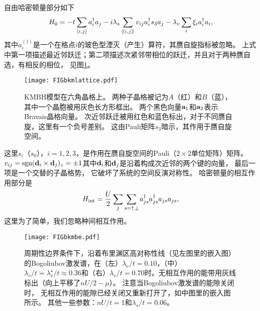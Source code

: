自由哈密顿量部分如下
\begin{equation}\label{KMBHh0}
	H_0 = -t\sum_{\expval{i,j}}a^\dagger_i a_j-i\lambda _s\sum_{\langle\!\langle i,j \rangle\!\rangle} v_{ij} a^\dagger_i s_3 a_j - \lambda_v \sum_i \xi_i a^\dagger_i a_i,
\end{equation}
其中$a^{(\dagger)}_i$是一个在格点$i$的玻色型湮灭（产生）算符，其赝自旋指标被忽略。
上式中第一项描述最近邻跃迁；第二项描述次紧邻带相位的跃迁，并且对于两种赝自选，有相反的相位，
见图\ref{KMBHlattice}。%
\begin{figure}
	\texttt{[image: FIGbkmlattice.pdf]}
	\caption{\label{KMBHlattice}
	KMBH模型在六角晶格上。
	两种子晶格被记为$A$（红）和$B$（蓝），其中一个晶胞被用灰色长方形框出。
	两个黑色向量$\vb a_1$和$\vb a_2$表示Bravais晶格向量。
	次近邻跃迁被用红色和蓝色标出，对于不同赝自旋，这里有一个负号差别。
	这由Pauli矩阵$s_3$暗示，其作用于赝自旋空间。}
\end{figure}
这里$s_i$（$s_0$），$i=1,2,3$，是作用在赝自旋空间的Pauli（$2\times 2$单位矩阵）矩阵。
$v_{ij}=\textnormal{sgn}(\vb d_i\times \vb d_j)_z=\pm 1$其中$\vb d_i$和$\vb d_j$是沿着构成次近邻的两个键的向量，
最后一项是一个交替的子晶格势，
它破坏了系统的空间反演对称性。
哈密顿量的相互作用部分是
\begin{equation}
	H_{\textnormal{int}}= \frac{U}{2}\sum_{j}\sum_{s=\uparrow,\downarrow} a^\dagger_{js}a^\dagger_{js}a_{js} a_{js},\label{hint}
\end{equation}
这里为了简单，我们忽略种间相互作用。



\begin{figure*}
	\texttt{[image: FIGbkmbe.pdf]}
	\caption{\label{KMBHbe}周期性边界条件下，沿着布里渊区高对称性线（见左图里的嵌入图）的Bogoliubov激发谱，在（左）$\lambda_v/t=0.10$，（中）$\lambda_v/t=\lambda_v^\star/t \approx 0.36$和（右）$\lambda_v/t=0.70$时。无相互作用的能带用灰线标出（向上平移了$nU/2-\mu$）。
	注意当Bogoliubov激发谱的能隙关闭时，
	无相互作用的能隙已经关闭又重新打开了，如中图里的嵌入图所示。
	其他一些参数：$nU/t=1$和$\lambda _s/t=0.06$。}
\end{figure*}

